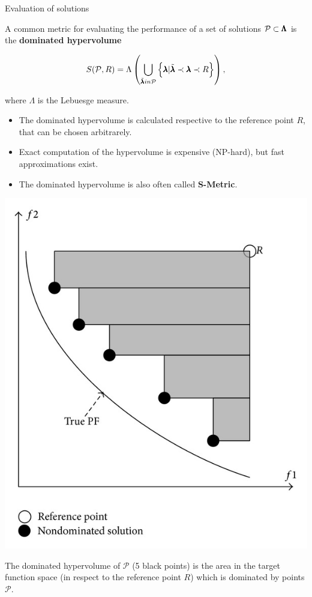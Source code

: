 \begin{frame}[allowframebreaks]{Evaluation of solutions}

A common metric for evaluating the performance of a set of solutions $\mathcal{P} \subset \pmb{\Lambda}$ is the \textbf{dominated hypervolume}

$$
    S(\mathcal{P}, R) = \Lambda\left(\bigcup_{\tilde{\pmb{\lambda}} in \mathcal{P}}\left\{\pmb{\lambda} | \tilde{\pmb{\lambda}} \prec \pmb{\lambda} \prec R\right\}\right),
$$

where $\Lambda$ is the Lebuesge measure.
    \vspace{1cm}
    \begin{itemize}
            \item The dominated hypervolume is calculated respective to the reference point $R$, that can be chosen arbitrarely.
            \item Exact computation of the hypervolume is expensive (NP-hard), but fast approximations exist.
            \item The dominated hypervolume is also often called \textbf{S-Metric}.
    \end{itemize}

\framebreak

\begin{center}
\includegraphics[width = 0.3\linewidth]{images/dominated_hypervolume.png}
\end{center}

The dominated hypervolume of $\mathcal{P}$ (5 black points) is the area in the target function space (in respect to the reference point $R$) which is dominated by points $\mathcal{P}$.

\framebreak



\end{frame}


